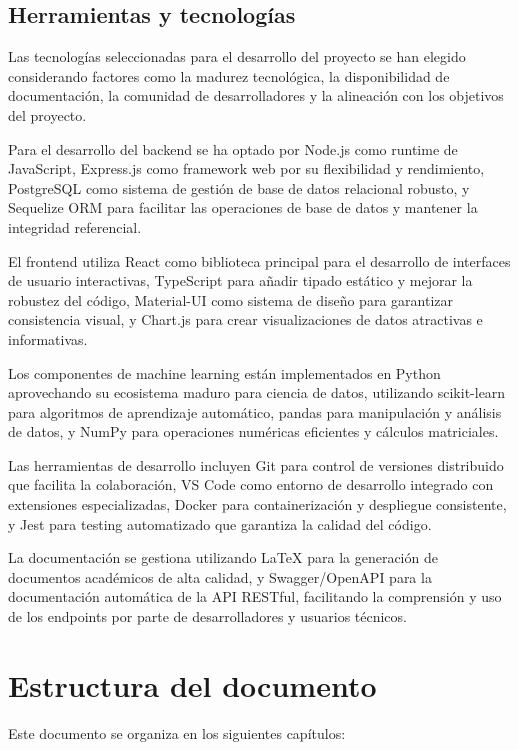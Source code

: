 \subsection{Herramientas y tecnologías}

Las tecnologías seleccionadas para el desarrollo del proyecto se han elegido considerando factores como la madurez tecnológica, la disponibilidad de documentación, la comunidad de desarrolladores y la alineación con los objetivos del proyecto.

Para el desarrollo del backend se ha optado por Node.js como runtime de JavaScript, Express.js como framework web por su flexibilidad y rendimiento, PostgreSQL como sistema de gestión de base de datos relacional robusto, y Sequelize ORM para facilitar las operaciones de base de datos y mantener la integridad referencial.

El frontend utiliza React como biblioteca principal para el desarrollo de interfaces de usuario interactivas, TypeScript para añadir tipado estático y mejorar la robustez del código, Material-UI como sistema de diseño para garantizar consistencia visual, y Chart.js para crear visualizaciones de datos atractivas e informativas.

Los componentes de machine learning están implementados en Python aprovechando su ecosistema maduro para ciencia de datos, utilizando scikit-learn para algoritmos de aprendizaje automático, pandas para manipulación y análisis de datos, y NumPy para operaciones numéricas eficientes y cálculos matriciales.

Las herramientas de desarrollo incluyen Git para control de versiones distribuido que facilita la colaboración, VS Code como entorno de desarrollo integrado con extensiones especializadas, Docker para containerización y despliegue consistente, y Jest para testing automatizado que garantiza la calidad del código.

La documentación se gestiona utilizando LaTeX para la generación de documentos académicos de alta calidad, y Swagger/OpenAPI para la documentación automática de la API RESTful, facilitando la comprensión y uso de los endpoints por parte de desarrolladores y usuarios técnicos.

\section{Estructura del documento}

Este documento se organiza en los siguientes capítulos:

